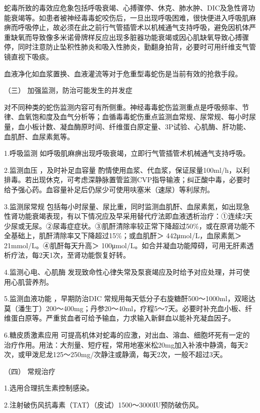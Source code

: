 蛇毒所致的毒效应危象包括呼吸衰竭、心搏骤停、休克、肺水肿、DIC及急性肾功能衰竭等。如患者被神经毒毒蛇咬伤后，一旦出现呼吸困难，很快便进入呼吸肌麻痹而呼吸停止，故必须在此之前行气管插管术以机械通气支持呼吸，避免因机体严重缺氧而导致像多米诺骨牌样反应出现多脏器功能衰竭或因心肌缺氧导致心搏骤停，同时注意防止坠积性肺炎和吸入性肺炎，勤翻身拍背，必要时可用纤维支气管镜直视下吸痰。

血液净化如血浆置换、血液灌流等对于危重型毒蛇伤是当前有效的抢救手段。

\hypertarget{text00172.htmlux5cux23CHP5-8-1-3-3-3}{}
（三） 加强监测，防治可能发生的并发症

对不同种类的蛇伤监测内容可有所侧重。神经毒毒蛇伤监测重点是呼吸频率、节律、血氧饱和度及血气分析等；血循毒毒蛇伤重点监测血常规、尿常规、每小时尿量，血小板计数、凝血酶原时间、纤维蛋白原定量、3P试验、心肌酶、肝功能、血肌酐、血尿素氮等。

1.呼吸监测 如呼吸肌麻痹出现呼吸衰竭，立即行气管插管术机械通气支持呼吸。

2.监测血压 ，及时补足血容量
酌情使用血浆、代血浆，保证尿量100ml/h，以利排毒。若出现休克，可考虑深静脉置管监测CVP指导输液；纠正酸中毒，必要时给予强心药。血容量补足后仍尿少可使用呋塞米（速尿）等利尿剂。

3.监测尿常规
包括每小时尿量、尿比重，同时监测血肌酐、血尿素氮，如出现急性肾功能衰竭表现，有以下情况应及早采用替代疗法即血液透析治疗：①连续2天少尿或无尿。②尿毒症症状。③肌酐清除率较正常下降超过50\%，或在原肾功能不全基础上，肌酐清除率又下降超过15\%；或血肌酐＞
442μmol/L，血尿素氮＞ 21mmol/L。④肌酐每天升高＞
100μmol/L。如合并凝血功能障碍，可用无肝素透析疗法，每2天1次，至肾功能恢复好转。

4.监测心电、心肌酶
发现致命性心律失常及泵衰竭应及时给予对应处理，并可使用心肌营养剂。

5.监测血液功能 ，早期防治DIC
常规用每天低分子右旋糖酐500～1000ml，双嘧达莫（潘生丁）200～400mg；丹参20～40ml，疗程5～7天。必要时补充血小板、纤维蛋白原等。严重贫血者可给予输血，力求输入新鲜血以能补充凝血因子。

6.糖皮质激素应用
可提高机体对蛇毒的应激，对出血、溶血、细胞坏死有一定的治疗作用。用法：大剂量、短疗程，常用地塞米松20mg加入补液中静滴，每天2次，或甲泼尼龙125～250mg/次静注或静滴，每天2次，一般不超过3天。

\hypertarget{text00172.htmlux5cux23CHP5-8-1-3-3-4}{}
（四） 常规治疗

1.选用合理抗生素控制感染。

2.注射破伤风抗毒素（TAT）（皮试）1500～3000IU预防破伤风。

